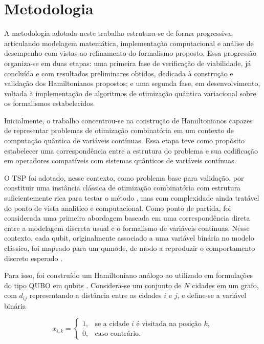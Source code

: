 \chapter{Metodologia} \label{cap:proposta}

    A metodologia adotada neste trabalho estrutura-se de forma progressiva, articulando modelagem matemática, implementação computacional e análise de desempenho com vistas ao refinamento do formalismo proposto. Essa progressão organiza-se em duas etapas: uma primeira fase de verificação de viabilidade, já concluída e com resultados preliminares obtidos, dedicada à construção e validação dos Hamiltonianos propostos; e uma segunda fase, em desenvolvimento, voltada à implementação de algoritmos de otimização quântica variacional sobre os formalismos estabelecidos.

    Inicialmente, o trabalho concentrou-se na construção de Hamiltonianos capazes de representar problemas de otimização combinatória em um contexto de computação quântica de variáveis contínuas. Essa etapa teve como propósito estabelecer uma correspondência entre a estrutura do problema e sua codificação em operadores compatíveis com sistemas quânticos de variáveis contínuas.

    O TSP foi adotado, nesse contexto, como problema base para validação, por constituir uma instância clássica de otimização combinatória com estrutura suficientemente rica para testar o método \cite{hartmanis1982computers}, mas com complexidade ainda tratável do ponto de vista analítico e computacional. Como ponto de partida, foi considerada uma primeira abordagem baseada em uma correspondência direta entre a modelagem discreta usual e o formalismo de variáveis contínuas. Nesse contexto, cada qubit, originalmente associado a uma variável binária no modelo clássico, foi mapeado para um qumode, de modo a reproduzir o comportamento discreto esperado \cite{verdon2019quantum}.

    Para isso, foi construído um Hamiltoniano análogo ao utilizado em formulações do tipo QUBO em qubits \cite{lucas2014ising}. Considera-se um conjunto de $N$ cidades em um grafo, com $d_{ij}$ representando a distância entre as cidades $i$ e $j$, e define-se a variável binária

    $$
    x_{i,k} =
    \begin{cases}
    1, & \text{se a cidade $i$ é visitada na posição $k$},\\
    0, & \text{caso contrário}.
    \end{cases}
    $$

